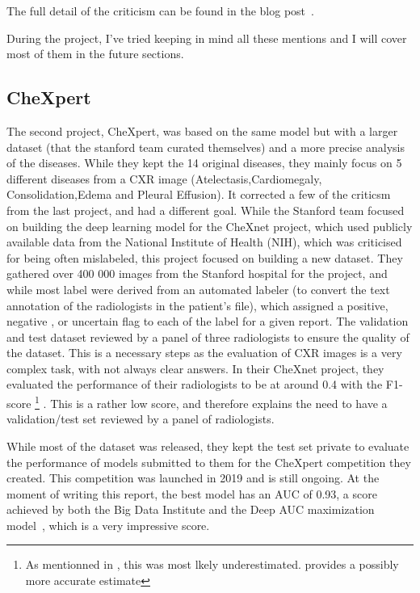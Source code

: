 \documentclass[11pt]{article}
\begin{document}
        The full detail of the criticism can be found in the blog post~\cite{chexnet_critic}.

        During the project, I've tried keeping in mind all these mentions and I will cover most of them in the future sections.

    \subsection{CheXpert}


        The second project, CheXpert, was based on the same model but with a larger dataset (that the stanford team curated themselves) and a more precise analysis
        of the diseases. While they kept the 14 original diseases, they mainly focus on 5 different diseases from a CXR image
        (Atelectasis,Cardiomegaly, Consolidation,Edema and Pleural Effusion). It corrected a few of the criticsm
        from the last project, and had a different goal. While the Stanford team focused on building the deep learning model
        for the CheXnet project, which used publicly available data from the National Institute of Health (NIH),
        which was criticised for being often mislabeled, this project focused on building a new dataset. They gathered
        over 400 000 images from the Stanford hospital for the project, and while most label were derived from an
        automated labeler (to convert the text annotation of the radiologists in the patient's file), which assigned
        a positive, negative , or uncertain flag to each of the label for a given report. The validation
        and test dataset reviewed by a panel of three radiologists to ensure the quality of the dataset.
        This is a necessary steps as the evaluation of CXR images is a very
        complex task, with not always clear answers. In their CheXnet project, they evaluated the performance of
        their radiologists to be at around 0.4 with the F1-score \footnote{As mentionned in \cite{chexnet_critic}, this was most lkely underestimated. \cite{chexzero} provides a possibly more accurate estimate} . This is a rather low score, and therefore explains
        the need to have a validation/test set reviewed by a panel of radiologists.

        While most of the dataset was released, they kept the test set private to evaluate the performance of models
        submitted to them for the CheXpert competition they created. This competition was launched in 2019 and is still
        ongoing. At the moment of writing this report, the best model has an AUC of 0.93, a score achieved by both
        the Big Data Institute\cite{hierarchical} and the Deep AUC maximization model~\cite{DeepAUC}, which is a
        very impressive score.
\end{document}
